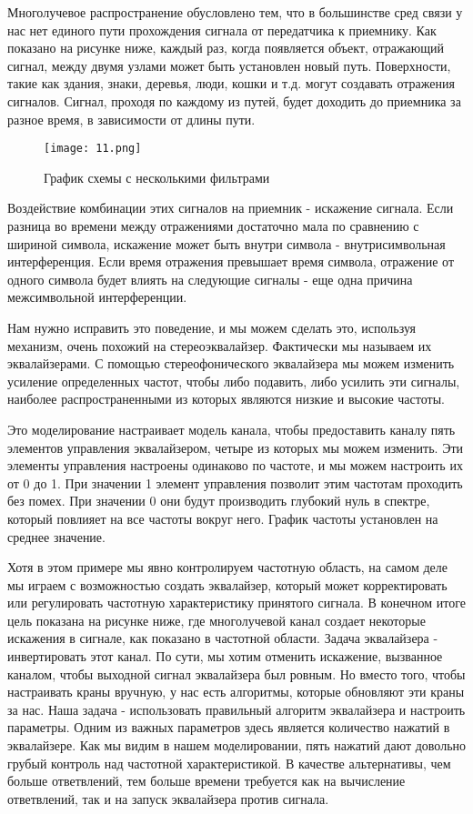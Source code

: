\documentclass[a4paper,12pt]{report}
\begin{document}
Многолучевое распространение обусловлено тем, что в большинстве сред связи у нас нет единого пути прохождения сигнала от передатчика к приемнику. Как показано на рисунке ниже, каждый раз, когда появляется объект, отражающий сигнал, между двумя узлами может быть установлен новый путь. Поверхности, такие как здания, знаки, деревья, люди, кошки и т.д. могут создавать отражения сигналов. Сигнал, проходя по каждому из путей, будет доходить до приемника за разное время, в зависимости от длины пути.  

\begin{figure}[H]
        \centering
        \texttt{[image: 11.png]}
        \caption{График схемы с несколькими фильтрами}
        \label{fig:ig4_1}
\end{figure}

Воздействие комбинации этих сигналов на приемник - искажение сигнала.
Если разница во времени между отражениями достаточно мала по сравнению с
шириной символа, искажение может быть внутри символа - внутрисимвольная
интерференция. Если время отражения превышает время символа, отражение
от одного символа будет влиять на следующие сигналы - еще одна причина
межсимвольной интерференции.

Нам нужно исправить это поведение, и мы можем сделать это, используя механизм, очень похожий на стереоэквалайзер. Фактически мы называем их эквалайзерами. С помощью стереофонического эквалайзера мы можем изменить усиление определенных частот, чтобы либо подавить, либо усилить эти сигналы,
наиболее распространенными из которых являются низкие и высокие частоты.

Это моделирование настраивает модель канала, чтобы предоставить каналу
пять элементов управления эквалайзером, четыре из которых мы можем изменить. Эти элементы управления настроены одинаково по частоте, и мы можем настроить их от 0 до 1. При значении 1 элемент управления позволит этим частотам проходить без помех. При значении 0 они будут производить глубокий нуль в спектре, который повлияет на все частоты вокруг него. График частоты установлен на среднее значение.

Хотя в этом примере мы явно контролируем частотную область, на самом деле мы играем с возможностью создать эквалайзер, который может корректировать или регулировать частотную характеристику принятого сигнала. В конечном итоге цель показана на рисунке ниже, где многолучевой канал создает некоторые искажения в сигнале, как показано в частотной области. Задача эквалайзера - инвертировать этот канал. По сути, мы хотим отменить искажение, вызванное каналом, чтобы выходной сигнал эквалайзера был ровным. Но вместо того, чтобы настраивать краны вручную, у нас есть алгоритмы, которые обновляют эти краны за нас. Наша задача - использовать правильный алгоритм эквалайзера и настроить параметры. Одним из важных параметров здесь является количество нажатий в эквалайзере. Как мы видим в нашем моделировании, пять нажатий дают довольно грубый контроль над частотной характеристикой. В качестве альтернативы, чем больше ответвлений, тем больше времени требуется как на вычисление ответвлений, так и на запуск эквалайзера против сигнала.
\end{document}
